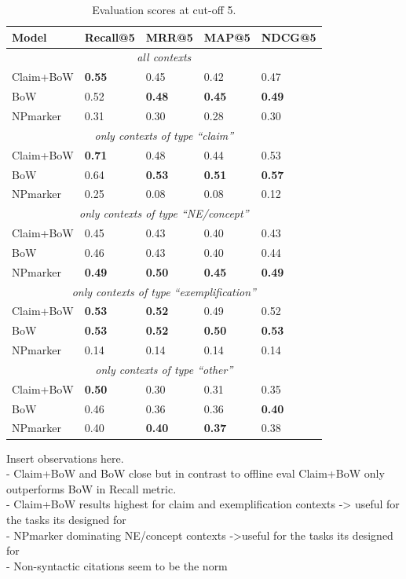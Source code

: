 \begin{table}[tb]
\centering
    \caption{Evaluation scores at cut-off 5.}
    \label{tab:userevalnumbers}
\begin{center}
    \begin{tabular}{lllll}
    \toprule
    Model & Recall@5 & MRR@5 & MAP@5 & NDCG@5 \\
    \midrule
    \multicolumn{5}{c}{\emph{all contexts}} \\
    \midrule
    Claim+BoW & \textbf{0.55} & 0.45 & 0.42 & 0.47 \\
    BoW       & 0.52 & \textbf{0.48} & \textbf{0.45} & \textbf{0.49} \\
    NPmarker  & 0.31 & 0.30 & 0.28 & 0.30 \\
    \midrule
    \multicolumn{5}{c}{\emph{only contexts of type ``claim''}} \\
    \midrule
    Claim+BoW & \textbf{0.71} & 0.48 & 0.44 & 0.53 \\
    BoW       & 0.64 & \textbf{0.53} & \textbf{0.51} & \textbf{0.57} \\
    NPmarker  & 0.25 & 0.08 & 0.08 & 0.12 \\
    \midrule
    \multicolumn{5}{c}{\emph{only contexts of type ``NE/concept''}} \\
    \midrule
    Claim+BoW & 0.45 & 0.43 & 0.40 & 0.43 \\
    BoW       & 0.46 & 0.43 & 0.40 & 0.44 \\
    NPmarker  & \textbf{0.49} & \textbf{0.50} & \textbf{0.45} & \textbf{0.49} \\
    \midrule
    \multicolumn{5}{c}{\emph{only contexts of type ``exemplification''}} \\
    \midrule
    Claim+BoW & \textbf{0.53} & \textbf{0.52} & 0.49 & 0.52 \\
    BoW       & \textbf{0.53} & \textbf{0.52} & \textbf{0.50} & \textbf{0.53} \\
    NPmarker  & 0.14 & 0.14 & 0.14 & 0.14 \\
    \midrule
    \multicolumn{5}{c}{\emph{only contexts of type ``other''}} \\
    \midrule
    Claim+BoW & \textbf{0.50} & 0.30 & 0.31 & 0.35 \\
    BoW       & 0.46 & 0.36 & 0.36 & \textbf{0.40} \\
    NPmarker  & 0.40 & \textbf{0.40} & \textbf{0.37} & 0.38 \\
    \bottomrule
    \end{tabular}
\end{center}
\end{table}

Insert observations here.\\
- Claim+BoW and BoW close but in contrast to offline eval Claim+BoW only outperforms BoW in Recall metric.\\
- Claim+BoW results highest for claim and exemplification contexts -> useful for the tasks its designed for\\
- NPmarker dominating NE/concept contexts ->useful for the tasks its designed for\\
- Non-syntactic citations seem to be the norm
